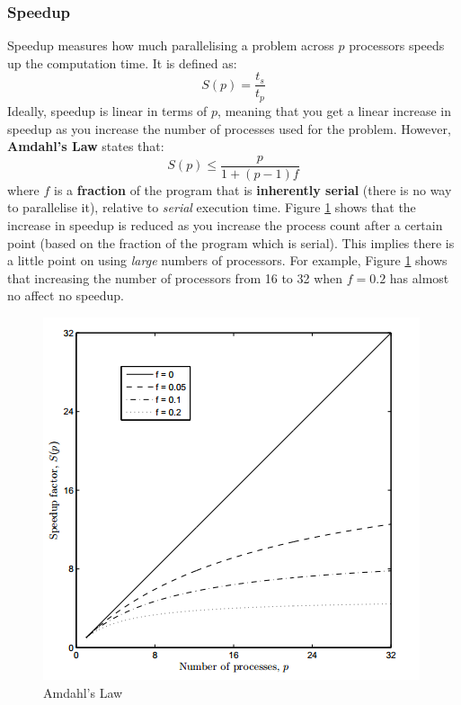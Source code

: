 \documentclass{article}
\begin{document}
\subsubsection{Speedup}

Speedup measures how much parallelising a problem across $p$ processors speeds up the computation time. It is defined as:
\begin{equation}
	S(p) = \frac{t_s}{t_p}
	\label{eq:speedup}
\end{equation}
Ideally, speedup is linear in terms of $p$, meaning that you get a linear increase in speedup as you increase the number of processes used for the problem. However, \textbf{Amdahl's Law} states that:
\begin{equation}
	S(p) \leq \frac{p}{1 + (p - 1)f}
	\label{eq:amdahl-law}
\end{equation}
where $f$ is a \textbf{fraction} of the program that is \textbf{inherently serial} (there is no way to parallelise it), relative to \textit{serial} execution time. Figure \ref{fig:amdahl} shows that the increase in speedup is reduced as you increase the process count after a certain point (based on the fraction of the program which is serial). This implies there is a little point on using \textit{large} numbers of processors. For example, Figure \ref{fig:amdahl} shows that increasing the number of processors from 16 to 32 when $f = 0.2$ has almost no affect no speedup.

\begin{figure}
	\centering
	\includegraphics[scale=0.7]{figures/amdahl-law.png}
	\caption{Amdahl's Law}
	\label{fig:amdahl}
\end{figure}
\end{document}

